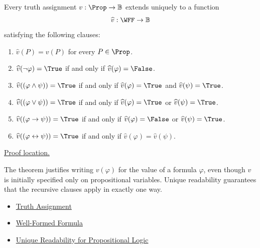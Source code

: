 \begin{tcolorbox}[colback=thmbox, colframe=thmborder, arc=2pt,
  left=6pt, right=6pt, top=4pt, bottom=4pt,
  title={\small\textbf{Theorem (Unique Extension of a Truth Assignment)}},
  fonttitle=\small\bfseries]
\label{thm:unique-extension-truth-assignment-propositional-logic}
Every truth assignment $v:\Prop\to\mathbb{B}$ extends uniquely to a function
\[
\widehat v:\WFF\to\mathbb{B}
\]
satisfying the following clauses:
\begin{enumerate}
  \item $\widehat v(P)=v(P)$ for every $P\in\Prop$.
  \item $\widehat v(\neg\varphi)=\True$ if and only if
        $\widehat v(\varphi)=\False$.
  \item $\widehat v((\varphi\land\psi))=\True$ if and only if
        $\widehat v(\varphi)=\True$ and $\widehat v(\psi)=\True$.
  \item $\widehat v((\varphi\lor\psi))=\True$ if and only if
        $\widehat v(\varphi)=\True$ or $\widehat v(\psi)=\True$.
  \item $\widehat v((\varphi\to\psi))=\True$ if and only if
        $\widehat v(\varphi)=\False$ or $\widehat v(\psi)=\True$.
  \item $\widehat v((\varphi\leftrightarrow\psi))=\True$ if and only if
        $\widehat v(\varphi)=\widehat v(\psi)$.
\end{enumerate}

\noindent\hyperref[prf:unique-extension-truth-assignment-propositional-logic]{Proof location.}
\end{tcolorbox}

\begin{remark*}[Interpretation]
The theorem justifies writing $v(\varphi)$ for the value of a formula
$\varphi$, even though $v$ is initially specified only on propositional
variables. Unique readability guarantees that the recursive clauses apply in
exactly one way.
\end{remark*}

\begin{dependencies}
\begin{itemize}
  \item \hyperref[def:truth-assignment-propositional-logic]{Truth Assignment}
  \item \hyperref[def:well-formed-formula]{Well-Formed Formula}
  \item \hyperref[thm:unique-readability-propositional-logic]{Unique Readability for Propositional Logic}
\end{itemize}
\end{dependencies}
